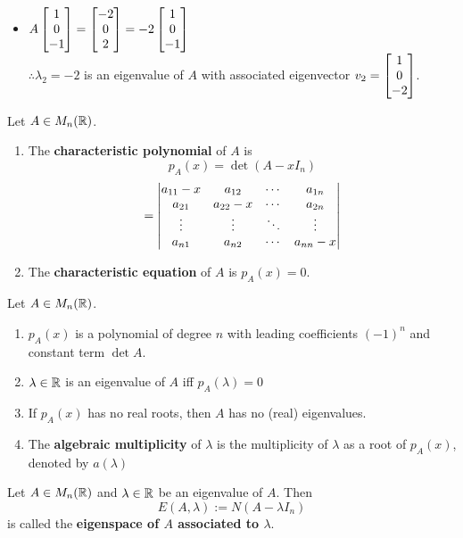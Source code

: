 \begin{example}
\begin{enumerate}
\begin{itemize}
        \item $A\begin{bmatrix} 1 \\ 0 \\ -1 \end{bmatrix} = \begin{bmatrix} -2 \\ 0 \\ 2 \end{bmatrix} = -2\begin{bmatrix} 1 \\ 0 \\ -1 \end{bmatrix}$ \\
        $\therefore \lambda_2 = -2$ is an eigenvalue of $A$ with associated eigenvector $v_2 = \begin{bmatrix} 1 \\ 0 \\ -2 \end{bmatrix}$.
    \end{itemize}
\end{enumerate}
\end{example}

\newpage
\begin{definition}
Let $A \in M_n(\mathbb{R})$.
\begin{enumerate}
    \item The \textbf{characteristic polynomial} of $A$ is 
    $$p_A(x) = \det(A - xI_n)$$
    $$=\begin{vmatrix} a_{11} - x & a_{12} & \cdots & a_{1n} \\ a_{21} & a_{22} - x & \cdots & a_{2n} \\ \vdots & \vdots & \ddots & \vdots \\ a_{n1} & a_{n2} & \cdots & a_{nn} - x \end{vmatrix}$$
    \item The \textbf{characteristic equation} of $A$ is $p_A(x) = 0$.
\end{enumerate}
\end{definition}

\begin{remark}
Let $A \in M_n(\mathbb{R})$.
\leavevmode
\begin{enumerate}
    \item $p_A(x)$ is a polynomial of degree $n$ with leading coefficients $(-1)^n$ and constant term $\det A$.
    \item $\lambda \in \mathbb{R}$ is an eigenvalue of $A$ iff $p_A(\lambda) = 0$
    \item If $p_A(x)$ has no real roots, then $A$ has no (real) eigenvalues. 
    \item The \textbf{algebraic multiplicity} of $\lambda$ is the multiplicity of $\lambda$ as a root of $p_A(x)$, denoted by $a(\lambda)$
\end{enumerate}
\end{remark}

\begin{definition}
Let $A \in M_n(\mathbb{R})$ and $\lambda \in \mathbb{R}$ be an eigenvalue of $A$. Then
$$E(A, \lambda):= N(A - \lambda I_n)$$
is called the \textbf{eigenspace of $A$ associated to $\lambda$}.
\end{definition}

